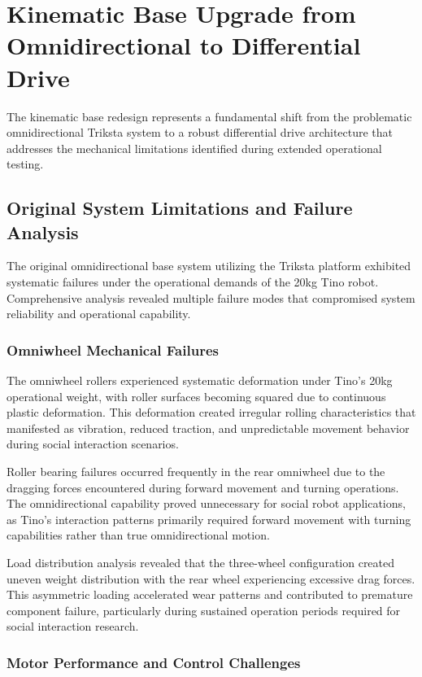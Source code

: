 \section{Kinematic Base Upgrade from Omnidirectional to Differential Drive}

The kinematic base redesign represents a fundamental shift from the problematic omnidirectional Triksta system to a robust differential drive architecture that addresses the mechanical limitations identified during extended operational testing.

\subsection{Original System Limitations and Failure Analysis}

The original omnidirectional base system utilizing the Triksta platform exhibited systematic failures under the operational demands of the 20kg Tino robot. Comprehensive analysis revealed multiple failure modes that compromised system reliability and operational capability.

\subsubsection{Omniwheel Mechanical Failures}

The omniwheel rollers experienced systematic deformation under Tino's 20kg operational weight, with roller surfaces becoming squared due to continuous plastic deformation. This deformation created irregular rolling characteristics that manifested as vibration, reduced traction, and unpredictable movement behavior during social interaction scenarios.

Roller bearing failures occurred frequently in the rear omniwheel due to the dragging forces encountered during forward movement and turning operations. The omnidirectional capability proved unnecessary for social robot applications, as Tino's interaction patterns primarily required forward movement with turning capabilities rather than true omnidirectional motion.

Load distribution analysis revealed that the three-wheel configuration created uneven weight distribution with the rear wheel experiencing excessive drag forces. This asymmetric loading accelerated wear patterns and contributed to premature component failure, particularly during sustained operation periods required for social interaction research.

\subsubsection{Motor Performance and Control Challenges}

